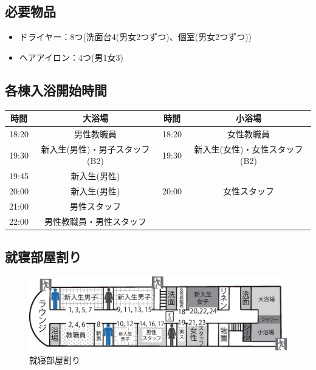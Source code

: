 \subsection{必要物品}
\begin{itemize}
\item ドライヤー：8つ(洗面台4(男女2つずつ)、個室(男女2つずつ))
\item ヘアアイロン：4つ(男1女3)
\end{itemize}

\subsection{各棟入浴開始時間}
\label{sec:bath}
\begin{table}[h]
\begin{center}
\begin{tabular}{|c|c|c|c|}
\hline
 {時間}&{大浴場}&{時間}&{小浴場} \\ \hline
 18:20 & 男性教職員 & 18:20 & 女性教職員 \\ \hline
 19:30 & 新入生(男性)・男子スタッフ(B2) & 19:30 & 新入生(女性)・女性スタッフ(B2) \\ \hline
 19:45 & 新入生(男性)& & \\ \hline 
 20:00 & 新入生(男性) & 20:00 & 女性スタッフ\\ \hline
 21:00 & 男性スタッフ & & \\ \hline
 22:00 & 男性教職員・男性スタッフ & & \\ \hline
\end{tabular}
\end{center}
\end{table}

\subsection{就寝部屋割り}
\begin{figure}[H]
\begin{center}
\includegraphics[scale=0.6]{./10/syushin.eps}
\vspace{-45mm}
\caption{就寝部屋割り}
\label{fig:futon_katazuke}
\end{center}
\end{figure}


